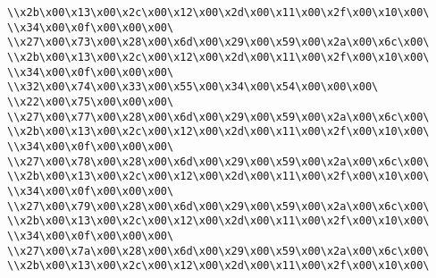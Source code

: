 \verb|\\x2b\x00\x13\x00\x2c\x00\x12\x00\x2d\x00\x11\x00\x2f\x00\x10\x00\|\newline
\verb|\\x34\x00\x0f\x00\x00\x00\|\newline
\verb|\\x27\x00\x73\x00\x28\x00\x6d\x00\x29\x00\x59\x00\x2a\x00\x6c\x00\|\newline
\verb|\\x2b\x00\x13\x00\x2c\x00\x12\x00\x2d\x00\x11\x00\x2f\x00\x10\x00\|\newline
\verb|\\x34\x00\x0f\x00\x00\x00\|\newline
\verb|\\x32\x00\x74\x00\x33\x00\x55\x00\x34\x00\x54\x00\x00\x00\|\newline
\verb|\\x22\x00\x75\x00\x00\x00\|\newline
\verb|\\x27\x00\x77\x00\x28\x00\x6d\x00\x29\x00\x59\x00\x2a\x00\x6c\x00\|\newline
\verb|\\x2b\x00\x13\x00\x2c\x00\x12\x00\x2d\x00\x11\x00\x2f\x00\x10\x00\|\newline
\verb|\\x34\x00\x0f\x00\x00\x00\|\newline
\verb|\\x27\x00\x78\x00\x28\x00\x6d\x00\x29\x00\x59\x00\x2a\x00\x6c\x00\|\newline
\verb|\\x2b\x00\x13\x00\x2c\x00\x12\x00\x2d\x00\x11\x00\x2f\x00\x10\x00\|\newline
\verb|\\x34\x00\x0f\x00\x00\x00\|\newline
\verb|\\x27\x00\x79\x00\x28\x00\x6d\x00\x29\x00\x59\x00\x2a\x00\x6c\x00\|\newline
\verb|\\x2b\x00\x13\x00\x2c\x00\x12\x00\x2d\x00\x11\x00\x2f\x00\x10\x00\|\newline
\verb|\\x34\x00\x0f\x00\x00\x00\|\newline
\verb|\\x27\x00\x7a\x00\x28\x00\x6d\x00\x29\x00\x59\x00\x2a\x00\x6c\x00\|\newline
\verb|\\x2b\x00\x13\x00\x2c\x00\x12\x00\x2d\x00\x11\x00\x2f\x00\x10\x00\|\newline

